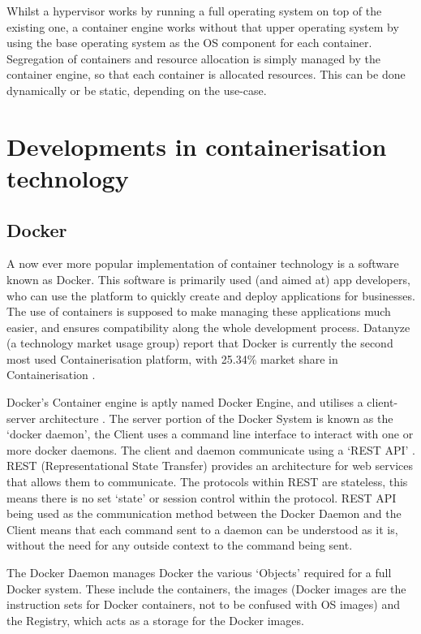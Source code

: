 Whilst a hypervisor works by running a full operating system on top of the existing one, a container engine works without that upper operating system by using the base operating system as the OS component for each container. Segregation of containers and resource allocation is simply managed by the container engine, so that each container is allocated resources. This can be done dynamically or be static, depending on the use-case.




\section{Developments in containerisation technology}

\subsection{Docker}
A now ever more popular implementation of container technology is a software known as Docker. This software is primarily used (and aimed at) app developers, who can use the platform to quickly create and deploy applications for businesses. The use of containers is supposed to make managing these applications much easier, and ensures compatibility along the whole development process.
Datanyze (a technology market usage group) report that Docker is currently the second most used Containerisation platform, with 25.34\% market share in Containerisation \citep{datanyze}. 

Docker's Container engine is aptly named Docker Engine, and utilises a client-server architecture \citep[Section: Docker architecture]{DockerOverview}. The server portion of the Docker System is known as the `docker daemon', the Client uses a command line interface to interact with one or more docker daemons. The client and daemon communicate using a `REST API' \citep[Section: The Docker daemon]{DockerOverview}. REST (Representational State Transfer) provides an architecture for web services \citep{W3Architecture2004} that allows them to communicate. The protocols within REST are stateless, this means there is no set `state' or session control within the protocol. REST API being used as the communication method between the Docker Daemon and the Client means that each command sent to a daemon can be understood as it is, without the need for any outside context to the command being sent.

The Docker Daemon manages Docker the various `Objects' \citep[Section: Docker objects]{DockerOverview} required for a full Docker system. These include the containers, the images (Docker images are the instruction sets for Docker containers, not to be confused with OS images) and the Registry, which acts as a storage for the Docker images.







